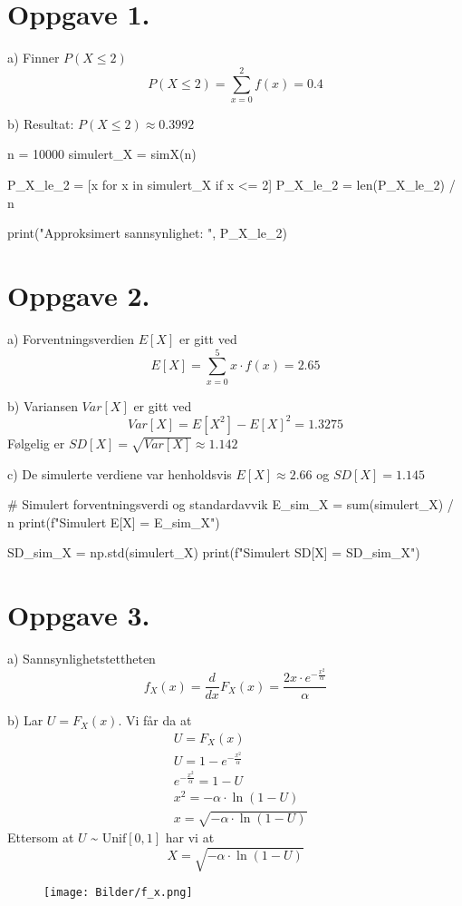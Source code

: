\documentclass[a4paper,11pt,norsk]{article}
\begin{document}


\section*{Oppgave 1.}
a) Finner $P(X \leq 2)$
\[
    P(X \leq 2) = \sum_{x=0}^{2} f(x) = 0.4
\]

b) Resultat: $P(X \leq 2) \approx 0.3992$
\begin{pythoncode}
    n = 10000
    simulert_X = simX(n)

    P_X_le_2 = [x for x in simulert_X if x <= 2]
    P_X_le_2 = len(P_X_le_2) / n

    print("Approksimert sannsynlighet: ", P_X_le_2)
\end{pythoncode}

\section*{Oppgave 2.}
a) Forventningsverdien $E[X]$ er gitt ved
\[
    E[X] = \sum_{x=0}^{5} x \cdot f(x) = 2.65
\]

b) Variansen $Var[X]$ er gitt ved
\[
    Var[X] = E[X^2] - E[X]^2 = 1.3275
\]
Følgelig er $SD[X] = \sqrt{Var[X]} \approx 1.142$

c) De simulerte verdiene var henholdsvis $E[X] \approx 2.66$ og $SD[X] = 1.145$
\begin{pythoncode}
    # Simulert forventningsverdi og standardavvik
    E_sim_X = sum(simulert_X) / n
    print(f"Simulert E[X] = {E_sim_X}")

    SD_sim_X = np.std(simulert_X)
    print(f"Simulert SD[X] = {SD_sim_X}")
\end{pythoncode}

\section*{Oppgave 3.}
a) Sannsynlighetstettheten 
\[
    f_{X}(x) = \frac{d}{dx}F_{X}(x) = \frac{2x \cdot e^{-\frac{x^2}{\alpha}}}{\alpha}
\]

b) Lar $U = F_X(x)$. Vi får da at
\begin{align*}
    &U = F_X(x) \\
    &U = 1 - e^{-\frac{x^2}{\alpha}} \\
    &e^{-\frac{x^2}{\alpha}} = 1 - U \\
    &x^2 = -\alpha \cdot \ln{\left(1 - U\right)} \\
    & x = \sqrt{-\alpha \cdot \ln{\left(1 - U\right)}}
\end{align*}
Ettersom at $U \text{ \textasciitilde } \text{ Unif}[0, 1]$ har vi at 
\[
    X = \sqrt{-\alpha \cdot \ln{\left(1 - U\right)}}
\]
\newpage
\begin{figure}[H]
    \centering
    \texttt{[image: Bilder/f\_x.png]}
\end{figure}
\end{document}
